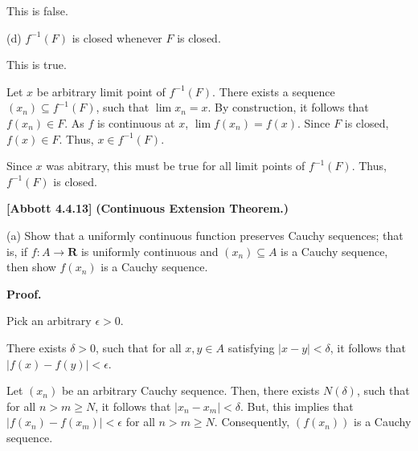 \documentclass[10pt]{article}
\begin{document}
This is false. 



(d) $\displaystyle f^{-1}( F)$ is closed whenever $\displaystyle F$ is closed. 



This is true.



Let $\displaystyle x$ be arbitrary limit point of $\displaystyle f^{-1}( F)$. There exists a sequence $\displaystyle ( x_{n}) \subseteq f^{-1}( F)$, such that $\displaystyle \lim x_{n} =x$. By construction, it follows that $\displaystyle f( x_{n}) \in F$. As $\displaystyle f$ is continuous at $\displaystyle x$, $\displaystyle \lim f( x_{n}) =f( x)$. Since $\displaystyle F$ is closed, $\displaystyle f( x) \in F$. Thus, $\displaystyle x\in f^{-1}( F)$.



Since $\displaystyle x$ was abitrary, this must be true for all limit points of $\displaystyle f^{-1}( F)$. Thus, $\displaystyle f^{-1}( F)$ is closed.



\textbf{[Abbott 4.4.13]} \textbf{(Continuous Extension Theorem.)} 



(a) Show that a uniformly continuous function preserves Cauchy sequences; that is, if $\displaystyle f:A\rightarrow \mathbf{R}$ is uniformly continuous and $\displaystyle ( x_{n}) \subseteq A$ is a Cauchy sequence, then show $\displaystyle f( x_{n})$ is a Cauchy sequence.



\textbf{Proof.}



Pick an arbitrary $\displaystyle \epsilon  >0$.



There exists $\displaystyle \delta  >0$, such that for all $\displaystyle x,y\in A$ satisfying $\displaystyle |x-y|< \delta $, it follows that $\displaystyle |f( x) -f( y) |< \epsilon $.



Let $\displaystyle ( x_{n})$ be an arbitrary Cauchy sequence. Then, there exists $\displaystyle N( \delta )$, such that for all $\displaystyle n >m\geq N$, it follows that $\displaystyle |x_{n} -x_{m} |< \delta $. But, this implies that $\displaystyle |f( x_{n}) -f( x_{m}) |< \epsilon $ for all $\displaystyle n >m\geq N$. Consequently, $\displaystyle ( f( x_{n}))$ is a Cauchy sequence.
\end{document}
